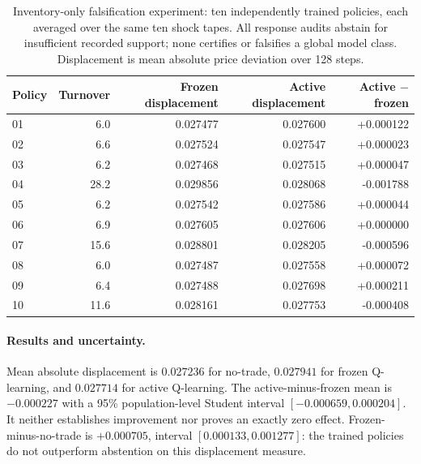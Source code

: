 \documentclass[10pt,twocolumn,letterpaper]{article}
\theoremstyle{definition}
\theoremstyle{remark}
\begin{document}
\begin{table}[htbp]
\centering\small
\caption{Inventory-only falsification experiment: ten independently trained policies, each averaged over the same ten shock tapes. All response audits abstain for insufficient recorded support; none certifies or falsifies a global model class. Displacement is mean absolute price deviation over 128 steps.}
\label{tab:q_learning_transfer}
\begin{tabular}{lrrrr}\toprule
Policy & Turnover & Frozen displacement & Active displacement & Active $-$ frozen\\\midrule
01 & 6.0 & 0.027477 & 0.027600 & +0.000122 \\
02 & 6.6 & 0.027524 & 0.027547 & +0.000023 \\
03 & 6.2 & 0.027468 & 0.027515 & +0.000047 \\
04 & 28.2 & 0.029856 & 0.028068 & -0.001788 \\
05 & 6.2 & 0.027542 & 0.027586 & +0.000044 \\
06 & 6.9 & 0.027605 & 0.027606 & +0.000000 \\
07 & 15.6 & 0.028801 & 0.028205 & -0.000596 \\
08 & 6.0 & 0.027487 & 0.027558 & +0.000072 \\
09 & 6.4 & 0.027488 & 0.027698 & +0.000211 \\
10 & 11.6 & 0.028161 & 0.027753 & -0.000408 \\
\bottomrule\end{tabular}
\end{table}

\paragraph{Results and uncertainty.}
Mean absolute displacement is $0.027236$ for no-trade, $0.027941$ for frozen Q-learning, and $0.027714$ for active Q-learning. The active-minus-frozen mean is $-0.000227$ with a 95\% population-level Student interval $[-0.000659,0.000204]$. It neither establishes improvement nor proves an exactly zero effect. Frozen-minus-no-trade is $+0.000705$, interval $[0.000133,0.001277]$: the trained policies do not outperform abstention on this displacement measure.
\end{document}
